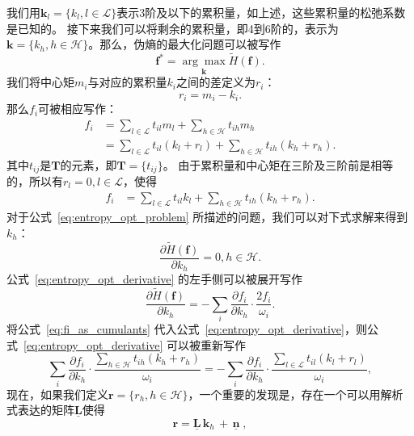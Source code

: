 我们用$\bm{k}_l=\{k_l, l\!\in\!\mathcal{L}\}$表示3阶及以下的累积量，如上述，这些累积量的松弛系数是已知的。
接下来我们可以将剩余的累积量，即4到6阶的，表示为$\bm{k}=\{k_h, h\!\in\!\mathcal{H}\}$。那么，伪熵的最大化问题可以被写作
\begin{equation}
    \label{eq:entropy_opt_problem}
    \bm{f}^{*} = \underset{\bm{k}}{\arg \max } \tilde{H}(\bm{f}).
\end{equation}
我们将中心矩$m_i$与对应的累积量$k_i$之间的差定义为$r_i$：
\begin{equation}
    r_i = m_i - k_i.
\end{equation}
那么$f_i$可被相应写作：
\begin{align}
    f_i &= \sum_{l \in \mathcal{L}} t_{il}m_l+\sum_{h \in \mathcal{H}} t_{ih}m_h \\
    &= \sum_{l \in \mathcal{L}} t_{il}(k_l + r_l)+\sum_{h \in \mathcal{H}} t_{ih}(k_h + r_h).
\end{align}
其中$t_{ij}$是$\bm{T}$的元素，即$\bm{T}=\{t_{ij}\}$。
由于累积量和中心矩在三阶及三阶前是相等的，所以有$r_l = 0, l \!\in\! \mathcal{L}$，使得
\begin{align}
    f_i &= \sum_{l \in \mathcal{L}} t_{il}k_l + \sum_{h \in \mathcal{H}} t_{ih}(k_h + r_h). \label{eq:fi_as_cumulants}
\end{align}
对于公式~\ref{eq:entropy_opt_problem} 所描述的问题，我们可以对下式求解来得到$k_h$：
\begin{equation}
    \label{eq:entropy_opt_derivative}
    \frac{\partial \tilde{H}(\bm{f})}{\partial k_h} = 0, h \in \mathcal{H}.
\end{equation}
公式~\ref{eq:entropy_opt_derivative} 的左手侧可以被展开写作
\begin{equation}
    \frac{\partial \tilde{H}(\bm{f})}{\partial k_h} = -\sum_i \frac{\partial f_i}{\partial k_h} \cdot \frac{2 f_i}{\omega_i}.
\end{equation}
将公式~\ref{eq:fi_as_cumulants} 代入公式~\ref{eq:entropy_opt_derivative}，则公式~\ref{eq:entropy_opt_derivative} 可以被重新写作
\begin{equation}
    \label{eq:entropy_opt_expanded}
    \sum_i \frac{\partial f_i}{\partial k_h} \cdot \frac{\sum_{h \in \mathcal{H}} t_{ih}(k_h + r_h)}{\omega_i} = -\sum_i \frac{\partial f_i}{\partial k_h} \cdot \frac{\sum_{l \in \mathcal{L}} t_{il}(k_l + r_l)}{\omega_i},
\end{equation}
现在，如果我们定义$\bm{r} = \{r_h, h \!\in\! \mathcal{H}\}$，一个重要的发现是，存在一个可以用解析式表达的矩阵$\bm{\underline{L}}$使得
\begin{equation}
    \bm{r} = \bm{\underline{L}} \,\bm{k}_h \,+\,  \bm{\underline{n}}\;, \label{linearRelationKvsM}
\end{equation}
